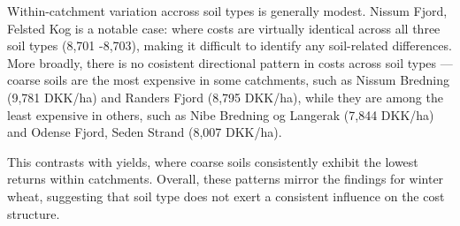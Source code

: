 \documentclass[12pt]{article}
\begin{document}
Within-catchment variation accross soil types is generally modest. Nissum Fjord, Felsted Kog is a notable case: where costs are virtually identical across all three soil types (8,701 -8,703), making it difficult to identify any soil-related differences. More broadly, there is no cosistent directional pattern in costs across soil types --- coarse soils are the most expensive in some catchments, such as Nissum Bredning (9,781 DKK/ha) and Randers Fjord (8,795 DKK/ha), while they are among the least expensive in others, such as Nibe Bredning og Langerak (7,844 DKK/ha) and Odense Fjord, Seden Strand (8,007 DKK/ha). 

This contrasts with yields, where coarse soils consistently exhibit the lowest returns within catchments. Overall, these patterns mirror the findings for winter wheat, suggesting that soil type does not exert a consistent influence on the cost structure.
\end{document}
